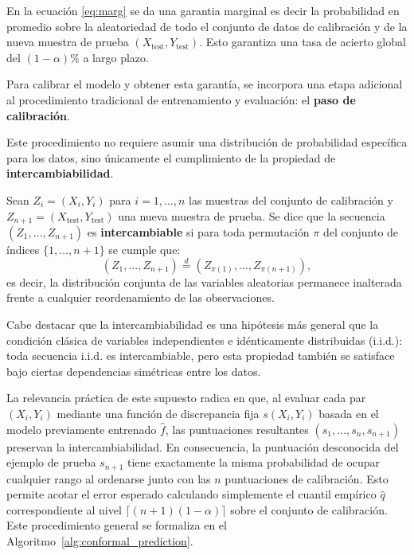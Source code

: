 En la ecuación \ref{eq:marg} se da una garantia marginal es decir la probabilidad en promedio sobre la aleatoriedad de todo el conjunto de datos de calibración y de la nueva muestra de prueba $(X_{\text{test}}, Y_{\text{test}})$. Esto garantiza una tasa de acierto global del $(1-\alpha)\%$ a largo plazo.


Para calibrar el modelo y obtener esta garantía, se incorpora una etapa adicional al procedimiento tradicional de entrenamiento y evaluación: el \textbf{paso de calibración}. 






Este procedimiento no requiere asumir una distribución de 
probabilidad específica para los datos, 
sino únicamente el cumplimiento de la propiedad de \textbf{intercambiabilidad}.


\begin{definicion}
Sean $Z_i = (X_i, Y_i)$ para $i = 1, \dots, n$ las muestras del conjunto de calibración y $Z_{n+1} = (X_{\text{test}}, Y_{\text{test}})$ una nueva muestra de prueba. Se dice que la secuencia $(Z_1, \dots, Z_{n+1})$ es \textbf{intercambiable} si para toda permutación $\pi$ del conjunto de índices $\{1, \dots, n+1\}$ se cumple que:
\begin{equation}
    (Z_1, \dots, Z_{n+1}) \stackrel{d}{=} (Z_{\pi(1)}, \dots, Z_{\pi(n+1)}),
\end{equation}
es decir, la distribución conjunta de las variables aleatorias permanece inalterada frente a cualquier reordenamiento de las observaciones.
\end{definicion}


Cabe destacar que la intercambiabilidad es una hipótesis más general que 
la condición clásica de variables independientes e idénticamente 
distribuidas (i.i.d.): toda secuencia i.i.d. es intercambiable, 
pero esta propiedad también se satisface bajo ciertas dependencias 
simétricas entre los datos.

La relevancia práctica de este supuesto radica en que, 
al evaluar cada par $(X_i, Y_i)$ mediante una función de discrepancia 
fija $s(X_i, Y_i)$ basada en el modelo previamente entrenado $\hat{f}$, 
las puntuaciones resultantes $(s_1, \dots, s_n, s_{n+1})$ preservan la 
intercambiabilidad. 
En consecuencia, la puntuación desconocida del ejemplo de prueba 
$s_{n+1}$ tiene exactamente la misma probabilidad de ocupar cualquier 
rango al ordenarse junto con las $n$ puntuaciones de calibración. 
Esto permite acotar el error esperado calculando simplemente el cuantil 
empírico $\hat{q}$ correspondiente al nivel $\lceil(n+1)(1-\alpha)\rceil$ 
sobre el conjunto de calibración. 
Este procedimiento general se formaliza 
en el Algoritmo~\ref{alg:conformal_prediction}.

